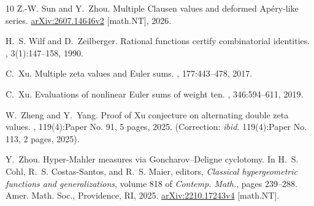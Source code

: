 \documentclass[final,notitlepage,12pt,reqno]{amsart}
\theoremstyle{plain}
\theoremstyle{definition}
\numberwithin{equation}{section}
\begin{document}
\begin{thebibliography}{10}
Z.-W. Sun and Y.~Zhou.
\newblock Multiple {C}lausen values and deformed {A}p\'ery-like series.
\newblock \url{arXiv:2607.14646v2} [math.NT], 2026.

H.~S. Wilf and D.~Zeilberger.
\newblock Rational functions certify combinatorial identities.
, 3(1):147--158, 1990.

C.~Xu.
\newblock Multiple zeta values and {E}uler sums.
, 177:443--478, 2017.

C.~Xu.
\newblock Evaluations of nonlinear {E}uler sums of weight ten.
, 346:594--611, 2019.

W.~Zheng and Y.~Yang.
\newblock Proof of {X}u conjecture on alternating double zeta values.
,
  119(4):Paper No. 91, 5 pages, 2025.
\newblock (Correction: \textit{ibid.} 119(4):Paper No. 113, 2 pages, 2025).

Y.~Zhou.
\newblock Hyper-{M}ahler measures via {G}oncharov--{D}eligne cyclotomy.
\newblock In H.~S. Cohl, R.~S. Costas-Santos, and R.~S. Maier, editors, {\em
  Classical hypergeometric functions and generalizations}, volume 818 of {\em
  Contemp. Math.}, pages 239--288. Amer. Math. Soc., Providence, RI, 2025.
\newblock \url{arXiv:2210.17243v4} [math.NT].

\end{thebibliography}
\end{document}
